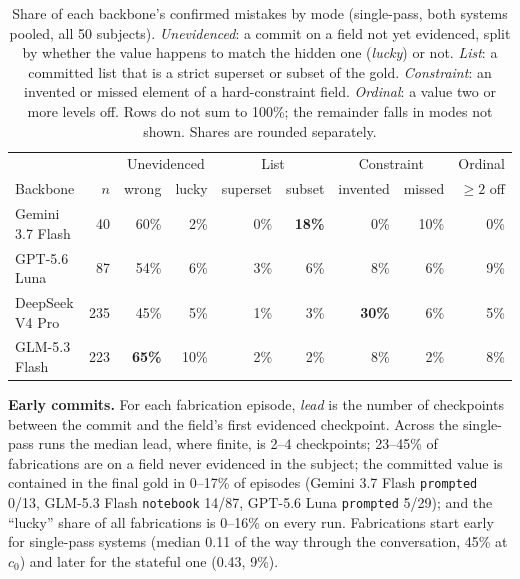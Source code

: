 \documentclass{article}
\begin{document}
\begin{table}[h]
  \centering
  \caption{Share of each backbone's confirmed mistakes by mode (single-pass, both systems pooled,
  all 50 subjects). \emph{Unevidenced}: a commit on a field not yet evidenced, split by whether the
  value happens to match the hidden one (\emph{lucky}) or not. \emph{List}: a committed list that
  is a strict superset or subset of the gold. \emph{Constraint}: an invented or missed element of a
  hard-constraint field. \emph{Ordinal}: a value two or more levels off. Rows do not sum to
  100\%; the remainder falls in modes not shown. Shares are rounded separately.}
  \label{tab:fail-profile}
  \small
  \begin{tabular}{@{}lrrrrrrrr@{}}
    \toprule
    & & \multicolumn{2}{c}{Unevidenced} & \multicolumn{2}{c}{List} & \multicolumn{2}{c}{Constraint}
      & Ordinal \\
    \cmidrule(lr){3-4} \cmidrule(lr){5-6} \cmidrule(lr){7-8} \cmidrule(l){9-9}
    Backbone & $n$ & wrong & lucky & superset & subset & invented & missed & ${\ge}2$ off \\
    \midrule
    Gemini 3.7 Flash & 40  & 60\% & 2\%  & 0\%  & \textbf{18\%} & 0\%  & 10\% & 0\% \\
    GPT-5.6 Luna     & 87  & 54\% & 6\%  & 3\%  & 6\%  & 8\%  & 6\%  & 9\% \\
    DeepSeek V4 Pro  & 235 & 45\% & 5\%  & 1\%  & 3\%  & \textbf{30\%} & 6\% & 5\% \\
    GLM-5.3 Flash    & 223 & \textbf{65\%} & 10\% & 2\% & 2\% & 8\% & 2\% & 8\% \\
    \bottomrule
  \end{tabular}
\end{table}

\textbf{Early commits.} For each fabrication episode, \emph{lead} is the number of checkpoints
between the commit and the field's first evidenced checkpoint. Across the single-pass runs
the median lead, where finite, is 2--4 checkpoints; 23--45\% of fabrications are on a field never
evidenced in the subject; the committed value is contained in the final gold in 0--17\% of episodes
(Gemini 3.7 Flash \texttt{prompted} 0/13, GLM-5.3 Flash \texttt{notebook} 14/87, GPT-5.6 Luna
\texttt{prompted} 5/29); and the ``lucky'' share of all fabrications is 0--16\% on every run.
Fabrications start early for single-pass systems (median 0.11 of the way through the conversation,
45\% at $c_0$) and later for the stateful one (0.43, 9\%).
\end{document}
